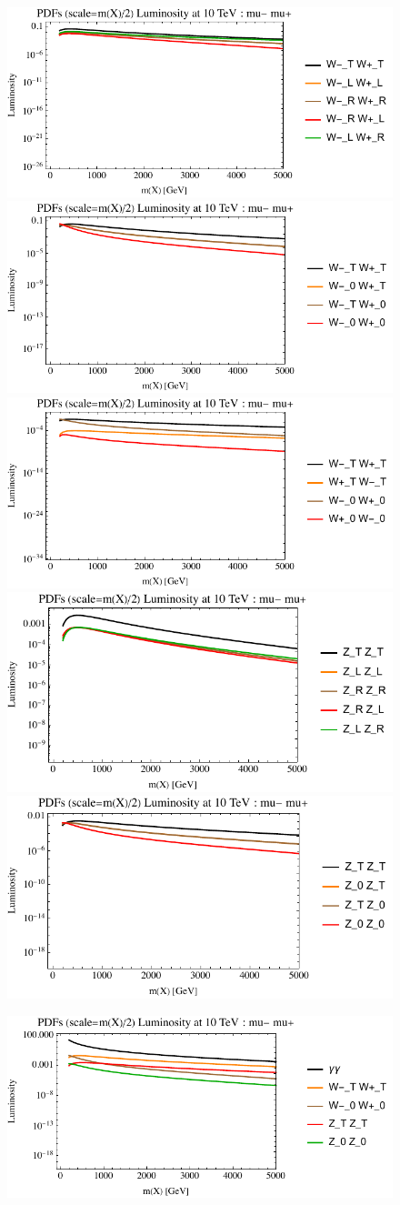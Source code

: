 \documentclass[a4paper,11pt]{article}
\begin{document}
\begin{figure}[ht]
\includegraphics[width=0.4\linewidth]{PlotLumi/10TeV/lumis/plotWWpolRandL.pdf}
\includegraphics[width=0.4\linewidth]{PlotLumi/10TeV/lumis/plotWWpolTand0.pdf}
\includegraphics[width=0.4\linewidth]{PlotLumi/10TeV/lumis/plotWmWpandWpWm.pdf}
\includegraphics[width=0.4\linewidth]{PlotLumi/10TeV/lumis/plotZZpolRandL.pdf}
\includegraphics[width=0.4\linewidth]{PlotLumi/10TeV/lumis/plotZZpolTand0.pdf}
\end{figure}

\begin{figure}
\includegraphics[width=0.4\linewidth]{PlotLumi/10TeV/lumis/plotgammaWZ.pdf}
\end{figure}
\end{document}
